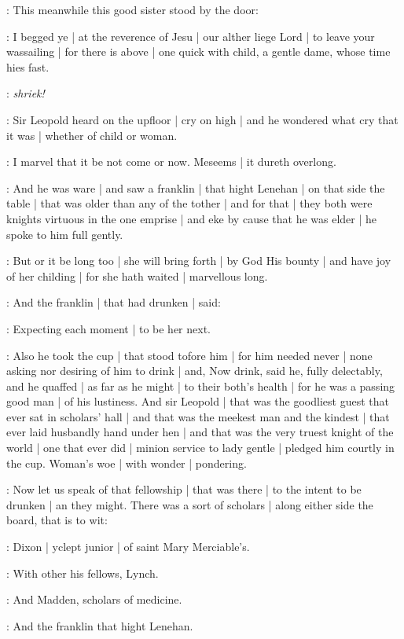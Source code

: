 :
This meanwhile this good sister stood by the door:

\nursecallan:
I begged ye |
at the reverence of Jesu |
our alther liege Lord |
to leave your wassailing |
for there is above |
one quick with child,
a gentle dame,
whose time hies fast.

\All:
\emph{shriek!}

:
Sir Leopold heard on the upfloor |
cry on high |
and he wondered what cry that it was |
whether of child or woman.

\Bloom:
I marvel that it be not come or now.
Meseems |
it dureth overlong.

:
And he was ware |
and saw a franklin |
that hight Lenehan |
on that side the table |
that was older than any of the tother |
and for that |
they both were knights virtuous in the one emprise |
and eke by cause that he was elder |
he spoke to him full gently.

\Bloom:
But or it be long too |
she will bring forth |
by God His bounty |
and have joy of her childing |
for she hath waited |
marvellous long.

:
And the franklin |
that had drunken |
said:

\lenehan:
Expecting each moment |
to be her next.

:
Also he took the cup |
that stood tofore him |
for him needed never |
none asking nor desiring of him to drink |
and,
Now drink,
said he,
fully delectably,
and he quaffed |
as far as he might |
to their both's health |
for he was a passing good man |
of his lustiness.
And sir Leopold |
that was the goodliest guest that ever sat in scholars' hall |
and that was the meekest man and the kindest |
that ever laid husbandly hand under hen |
and that was the very truest knight of the world |
one that ever did |
minion service to lady gentle |
pledged him courtly in the cup.
Woman's woe |
with wonder |
pondering.


:
Now let us speak of that fellowship |
that was there |
to the intent to be drunken |
an they might.
There was a sort of scholars |
along either side the board,
that is to wit:

:
Dixon |
yclept junior |
of saint Mary Merciable's.

:
With other his fellows,
Lynch.

:
And Madden,
scholars of medicine.

:
And the franklin that hight Lenehan.

